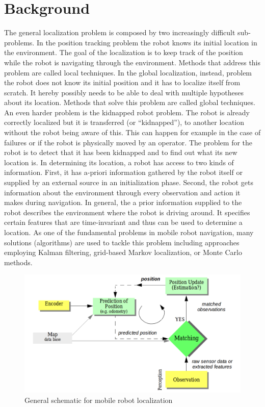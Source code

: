 \documentclass[10pt,journal,compsoc]{IEEEtran}
\begin{document}
    \section{Background}
    The general localization problem is composed by two increasingly difficult sub-problems. In the position tracking problem the robot knows its initial location in the environment. The goal of the localization is to keep track of the position while the robot is navigating through the environment. Methods that address this problem are called local techniques. In the global localization, instead, problem the robot does not know its initial position and it has to localize itself from scratch. It hereby possibly needs to be able to deal with multiple hypotheses about its location. Methods that solve this problem are called global techniques. An even harder problem is the kidnapped robot problem. The robot is already correctly localized but it is transferred (or “kidnapped”), to another location without the robot being aware of this. This can happen for example in the case of failures or if the robot is physically moved by an operator. The problem for the robot is to detect that it has been kidnapped and to find out what its new location is. In determining its location, a robot has access to two kinds of information. First, it has a-priori information gathered by the robot itself or supplied by an external source in an initialization phase. Second, the robot gets information about the environment through every observation and action it makes during navigation. In general, the a prior information supplied to the robot describes the environment where the robot is driving around. It specifies certain features that are time-invariant and thus can
    be used to determine a location.  As one of the fundamental problems in mobile robot navigation, many solutions (algorithms) are used to tackle this problem including approaches employing Kalman filtering, grid-based Markov localization,  or Monte Carlo methods.

    \begin{figure}[thptb]
        \centering
        \includegraphics[width=\linewidth]{generalnav.png}
        \caption{General schematic for mobile robot localization}
        \label{fig:robot1}
    \end{figure}
\end{document}
